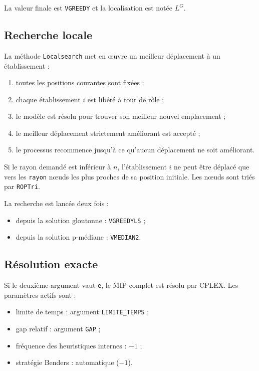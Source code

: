 \documentclass[11pt,a4paper]{article}
\newcommand{\code}[1]{\texttt{#1}}
\begin{document}
La valeur finale est \code{VGREEDY} et la localisation est notée $L^G$.

\subsection{Recherche locale}

La méthode \code{Localsearch} met en œuvre un meilleur déplacement à un
établissement :
\begin{enumerate}
  \item toutes les positions courantes sont fixées ;
  \item chaque établissement $i$ est libéré à tour de rôle ;
  \item le modèle est résolu pour trouver son meilleur nouvel emplacement ;
  \item le meilleur déplacement strictement améliorant est accepté ;
  \item le processus recommence jusqu'à ce qu'aucun déplacement ne soit
        améliorant.
\end{enumerate}

Si le rayon demandé est inférieur à $n$, l'établissement $i$ ne peut être
déplacé que vers les \code{rayon} nœuds les plus proches de sa position
initiale. Les nœuds sont triés par \code{ROPTri}.

La recherche est lancée deux fois :
\begin{itemize}
  \item depuis la solution gloutonne : \code{VGREEDYLS} ;
  \item depuis la solution p-médiane : \code{VMEDIAN2}.
\end{itemize}

\subsection{Résolution exacte}

Si le deuxième argument vaut \code{e}, le MIP complet est résolu par CPLEX.
Les paramètres actifs sont :
\begin{itemize}
  \item limite de temps : argument \code{LIMITE\_TEMPS} ;
  \item gap relatif : argument \code{GAP} ;
  \item fréquence des heuristiques internes : $-1$ ;
  \item stratégie Benders : automatique ($-1$).
\end{itemize}
\end{document}
